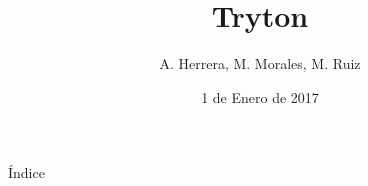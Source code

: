 \documentclass[compress]{beamer}
\title{Tryton}
\author[DDSI]{A. Herrera, M. Morales, M. Ruiz}
\date{1 de Enero de 2017}
\newcommand{\importsection}[1]{}           %
\begin{document}
	{
		\begin{frame}[plain]
			\titlepage
		\end{frame}
	}

	\importsection{Motivacion.tex}

	\begin{frame}{Índice}
		\hypertarget{index}{}
		\tableofcontents
	\end{frame}

	\importsection{Historia.tex}

	\importsection{Instalacion.tex}

	\importsection{Funcionalidad.tex}

	\importsection{VentajasInconvenientes.tex}

    \importsection{Empresas.tex}
\end{document}
